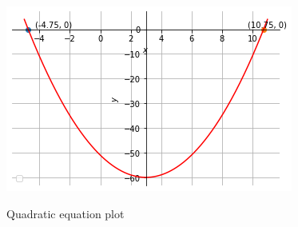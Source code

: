 \documentclass[journal,12pt,twocolumn]{IEEEtran}
\begin{document}
\begin{figure}[!ht]
\includegraphics[width=\columnwidth]{Parabola.png} \label{fig:image1}
\caption{Quadratic equation plot}
\end{figure}
\end{document}
